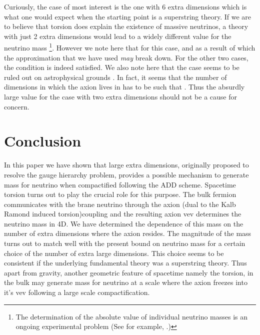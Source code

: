 \documentclass[a4paper,12pt]{article}
\begin{document}
Curiously, the case of most interest is the one with 6 extra
dimensions which is what one would expect when the starting point
is a superstring theory. If we are to believe that torsion does
explain the existence of massive neutrinos, a theory with just 2
extra dimensions would lead to a widely different value for the
neutrino mass {\footnote{The determination of the absolute value
of individual neutrino masses is an ongoing experimental problem
(See for example, \cite{Pas}.)}}. However we note here that for
this case, \coordHE{} and \coordHE{} as
a result of which the approximation that we have used {\it may}
break down. For the other two cases, the condition \coordHE{} is
indeed satisfied. We also note here that the \coordHE{} case
seems to be ruled out on astrophysical grounds \cite{Chang}. In
fact, it seems that the number of dimensions \coordHE{} in which the
axion lives in has to be such that \coordHE{}. Thus the absurdly
large value for the case with two extra dimensions should not be
a cause for concern.
\section{Conclusion}
In this paper we have shown that large extra dimensions,
originally proposed to resolve the gauge hierarchy problem,
provides a possible mechanism to generate mass for neutrino when
compactified  following the ADD scheme. Spacetime torsion turns
out to play the crucial role for this purpose. The bulk fermion
communicates with the brane neutrino through the axion (dual to
the Kalb Ramond induced torsion)coupling and the resulting axion
vev determines the neutrino mass in 4D. We have determined the
dependence of this mass on the number of extra dimensions where
the axion resides. The magnitude of the mass turns out to match
well with the present bound on neutrino mass for a certain choice
of the number of extra large dimensions. This choice seems to be
consistent if the underlying fundamental theory was a superstring
theory. Thus apart from gravity, another geometric feature of
spacetime namely the torsion, in the bulk may generate mass for
neutrino at a scale where the axion freezes into it's vev
following a large scale compactification.
\end{document}
